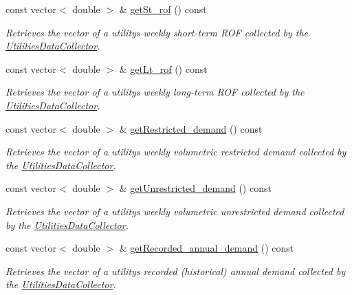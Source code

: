 \begin{DoxyCompactItemize}
const vector$<$ double $>$ \& \mbox{\hyperlink{classUtilitiesDataCollector_aa9bc5b8d31c3a0bec03906cded8c0cf4}{get\+St\+\_\+rof}} () const
\begin{DoxyCompactList}\small\item\em Retrieves the vector of a utility\textquotesingle{}s weekly short-\/term R\+OF collected by the {\ttfamily \mbox{\hyperlink{classUtilitiesDataCollector}{Utilities\+Data\+Collector}}}. \end{DoxyCompactList}\item 
const vector$<$ double $>$ \& \mbox{\hyperlink{classUtilitiesDataCollector_af7463f468d5aaa3a13bc610660323648}{get\+Lt\+\_\+rof}} () const
\begin{DoxyCompactList}\small\item\em Retrieves the vector of a utility\textquotesingle{}s weekly long-\/term R\+OF collected by the {\ttfamily \mbox{\hyperlink{classUtilitiesDataCollector}{Utilities\+Data\+Collector}}}. \end{DoxyCompactList}\item 
const vector$<$ double $>$ \& \mbox{\hyperlink{classUtilitiesDataCollector_a78421c65929a05cd1312006bca24e658}{get\+Restricted\+\_\+demand}} () const
\begin{DoxyCompactList}\small\item\em Retrieves the vector of a utility\textquotesingle{}s weekly volumetric restricted demand collected by the {\ttfamily \mbox{\hyperlink{classUtilitiesDataCollector}{Utilities\+Data\+Collector}}}. \end{DoxyCompactList}\item 
const vector$<$ double $>$ \& \mbox{\hyperlink{classUtilitiesDataCollector_a11319f69ba0cf1c932502e8c35d7f741}{get\+Unrestricted\+\_\+demand}} () const
\begin{DoxyCompactList}\small\item\em Retrieves the vector of a utility\textquotesingle{}s weekly volumetric unrestricted demand collected by the {\ttfamily \mbox{\hyperlink{classUtilitiesDataCollector}{Utilities\+Data\+Collector}}}. \end{DoxyCompactList}\item 
const vector$<$ double $>$ \& \mbox{\hyperlink{classUtilitiesDataCollector_a04b4760bce9c615d450d84cc27126ef7}{get\+Recorded\+\_\+annual\+\_\+demand}} () const
\begin{DoxyCompactList}\small\item\em Retrieves the vector of a utility\textquotesingle{}s recorded (historical) annual demand collected by the {\ttfamily \mbox{\hyperlink{classUtilitiesDataCollector}{Utilities\+Data\+Collector}}}. \end{DoxyCompactList}\item 

\end{DoxyCompactItemize}
